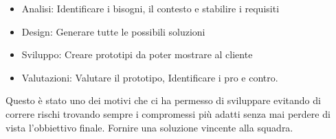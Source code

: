 \begin{itemize}
    \item Analisi: Identificare i bisogni, il contesto e stabilire i requisiti
    \item Design: Generare tutte le possibili soluzioni 
    \item Sviluppo: Creare prototipi da poter mostrare al cliente 
    \item Valutazioni: Valutare il prototipo, Identificare i pro e contro.
\end{itemize}

Questo è stato uno dei motivi che ci ha permesso di sviluppare evitando di correre rischi 
trovando sempre i compromessi più adatti senza mai perdere di vista l'obbiettivo finale.  
Fornire una soluzione vincente alla squadra. 


\newpage

